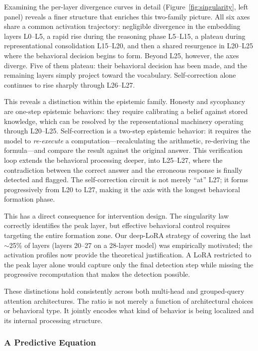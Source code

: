 \documentclass[11pt,a4paper]{article}
\begin{document}
Examining the per-layer divergence curves in detail (Figure~\ref{fig:singularity}, left panel) reveals a finer structure that enriches this two-family picture. All six axes share a common activation trajectory: negligible divergence in the embedding layers L0--L5, a rapid rise during the reasoning phase L5--L15, a plateau during representational consolidation L15--L20, and then a shared resurgence in L20--L25 where the behavioral decision begins to form. Beyond L25, however, the axes diverge. Five of them plateau: their behavioral decision has been made, and the remaining layers simply project toward the vocabulary. Self-correction alone continues to rise sharply through L26--L27.

This reveals a distinction within the epistemic family. Honesty and sycophancy are one-step epistemic behaviors: they require calibrating a belief against stored knowledge, which can be resolved by the representational machinery operating through L20--L25. Self-correction is a two-step epistemic behavior: it requires the model to \emph{re-execute} a computation---recalculating the arithmetic, re-deriving the formula---and compare the result against the original answer. This verification loop extends the behavioral processing deeper, into L25--L27, where the contradiction between the correct answer and the erroneous response is finally detected and flagged. The self-correction circuit is not merely ``at'' L27; it forms progressively from L20 to L27, making it the axis with the longest behavioral formation phase.

This has a direct consequence for intervention design. The singularity law correctly identifies the peak layer, but effective behavioral control requires targeting the entire formation zone. Our deep-LoRA strategy of covering the last $\sim$25\% of layers (layers 20--27 on a 28-layer model) was empirically motivated; the activation profiles now provide the theoretical justification. A LoRA restricted to the peak layer alone would capture only the final detection step while missing the progressive recomputation that makes the detection possible.

These distinctions hold consistently across both multi-head and grouped-query attention architectures. The ratio is not merely a function of architectural choices or behavioral type. It jointly encodes what kind of behavior is being localized and its internal processing structure.

\subsubsection{A Predictive Equation}
\end{document}
